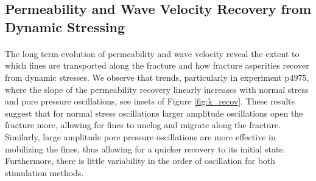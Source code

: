 \documentclass[letterpaper,10pt]{article}
\begin{document}
\subsection{Permeability and Wave Velocity Recovery from Dynamic Stressing}
\paragraph{}
The long term evolution of permeability and wave velocity reveal the extent to which fines are transported along the fracture and how fracture asperities recover from dynamic stresses. We observe that trends, particularly in experiment p4975, where the slope of the permeability recovery linearly increases with normal stress and pore pressure oscillations, see insets of Figure \ref{fig:k_recov}. These results suggest that for normal stress oscillations larger amplitude oscillations open the fracture more, allowing for fines to unclog and migrate along the fracture. Similarly, large amplitude pore pressure oscillations are more effective in mobilizing the fines, thus allowing for a quicker recovery to its initial state. Furthermore, there is little variability in the order of oscillation for both stimulation methods. 
\end{document}
